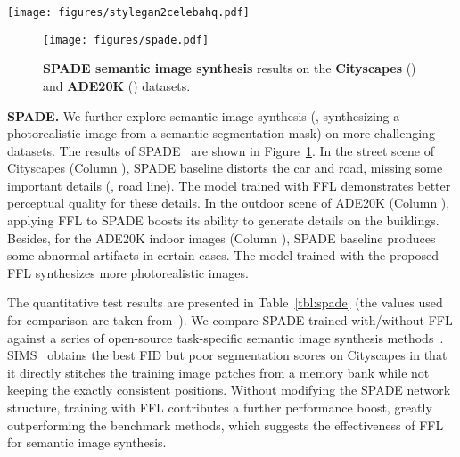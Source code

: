 \documentclass[10pt,twocolumn,letterpaper]{article}
\begin{document}
\begin{figure*}[t]
	\centering
\texttt{[image: figures/stylegan2celebahq.pdf]}
	\vspace{-0.05cm}
	\caption{\textbf{StyleGAN2 unconditional image synthesis} results (without truncation) and the mini-batch average spectra (adjusted to better contrast) on the \textbf{CelebA-HQ} () dataset.}
	\label{fig:stylegan2celebahq}
	\vspace{-0.4cm}
\end{figure*}


\begin{figure}[t]
	\centering
\texttt{[image: figures/spade.pdf]}
\caption{\textbf{SPADE semantic image synthesis} results on the \textbf{Cityscapes} () and \textbf{ADE20K} () datasets.}
	\label{fig:spade}
	\vspace{-0.45cm}
\end{figure}



\vspace{0.05cm}
\noindent
\textbf{SPADE.}
We further explore semantic image synthesis (\ie, synthesizing a photorealistic image from a semantic segmentation mask) on more challenging datasets.
The results of SPADE~\cite{SPADE} are shown in Figure~\ref{fig:spade}.
In the street scene of Cityscapes (Column ), SPADE baseline distorts the car and road, missing some important details (\eg, road line).
The model trained with FFL demonstrates better perceptual quality for these details.
In the outdoor scene of ADE20K (Column ), applying FFL to SPADE boosts its ability to generate details on the buildings.
Besides, for the ADE20K indoor images (Column ), SPADE baseline produces some abnormal artifacts in certain cases. The model trained with the proposed FFL synthesizes more photorealistic images.

The quantitative test results are presented in Table~\ref{tbl:spade} (the values used for comparison are taken from~\cite{SPADE}).
We compare SPADE trained with/without FFL against a series of open-source task-specific semantic image synthesis methods~\cite{CRN,SIMS,pix2pixhd}.
SIMS~\cite{SIMS} obtains the best FID but poor segmentation scores on Cityscapes in that it directly stitches the training image patches from a memory bank while not keeping the exactly consistent positions.
Without modifying the SPADE network structure, training with FFL contributes a further performance boost, greatly outperforming the benchmark methods, which suggests the effectiveness of FFL for semantic image synthesis.
\end{document}
